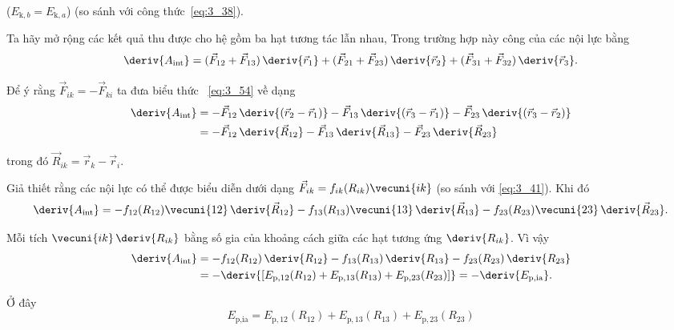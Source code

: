\noindent
($E_{\text{k},b}=E_{\text{k},a}$) (so sánh với công thức~\eqref{eq:3_38}).

Ta hãy mở rộng các kết quả thu được cho hệ gồm ba hạt tương tác lẫn nhau, Trong trường hợp này công của các nội lực bằng
\begin{equation}\label{eq:3_54}
\deriv{A_{\text{int}}} = (\vec{F}_{12} + \vec{F}_{13})\,\deriv{\vec{r}_1} + (\vec{F}_{21} + \vec{F}_{23})\,\deriv{\vec{r}_2} + (\vec{F}_{31} + \vec{F}_{32})\,\deriv{\vec{r}_3}.
\end{equation}

\noindent
Để ý rằng $\vec{F}_{ik}=-\vec{F}_{ki}$ ta đưa biểu thức ~\eqref{eq:3_54} về dạng
\begin{align}
\deriv{A_{\text{int}}} &= - \vec{F}_{12}\,\deriv{(\vec{r}_2-\vec{r}_1)} - \vec{F}_{13}\,\deriv{(\vec{r}_3-\vec{r}_1)} - \vec{F}_{23}\,\deriv{(\vec{r}_3-\vec{r}_2)}\nonumber\\
&= - \vec{F}_{12}\,\deriv{\vec{R}_{12}} - \vec{F}_{13}\,\deriv{\vec{R}_{13}} - \vec{F}_{23}\,\deriv{\vec{R}_{23}}\label{eq:3_55}
\end{align}

\noindent
trong đó $\vec{R}_{ik}=\vec{r}_k-\vec{r}_i$.

Giả thiết rằng các nội lực có thể được biểu diễn dưới dạng $\vec{F}_{ik}=f_{ik}(R_{ik})\vecuni{ik}$ (so sánh với \eqref{eq:3_41}). Khi đó
\begin{equation*}
\deriv{A_{\text{int}}} = - f_{12}(R_{12})\vecuni{12}\,\deriv{\vec{R}_{12}} - f_{13}(R_{13})\vecuni{13}\,\deriv{\vec{R}_{13}} - f_{23}(R_{23})\vecuni{23}\,\deriv{\vec{R}_{23}}.
\end{equation*}

\noindent
Mỗi tích $\vecuni{ik}\,\deriv{R_{ik}}$ bằng số gia của khoảng cách giữa các hạt tương ứng  $\deriv{R_{ik}}$. Vì vậy
\begin{align}
\deriv{A_{\text{int}}} &= - f_{12}(R_{12})\,\deriv{R_{12}} - f_{13}(R_{13})\,\deriv{R_{13}} - f_{23}(R_{23})\,\deriv{R_{23}}\nonumber\\
&= - \deriv{[E_{\text{p},12}(R_{12}) + E_{\text{p},13}(R_{13}) + E_{\text{p},23}(R_{23})]} = - \deriv{E_{\text{p,ia}}}.\label{eq:3_56}
\end{align}

\noindent
Ở đây 
\begin{equation}\label{eq:3_57}
E_{\text{p,ia}} = E_{\text{p},12}(R_{12}) + E_{\text{p},13}(R_{13}) + E_{\text{p},23}(R_{23})
\end{equation}

